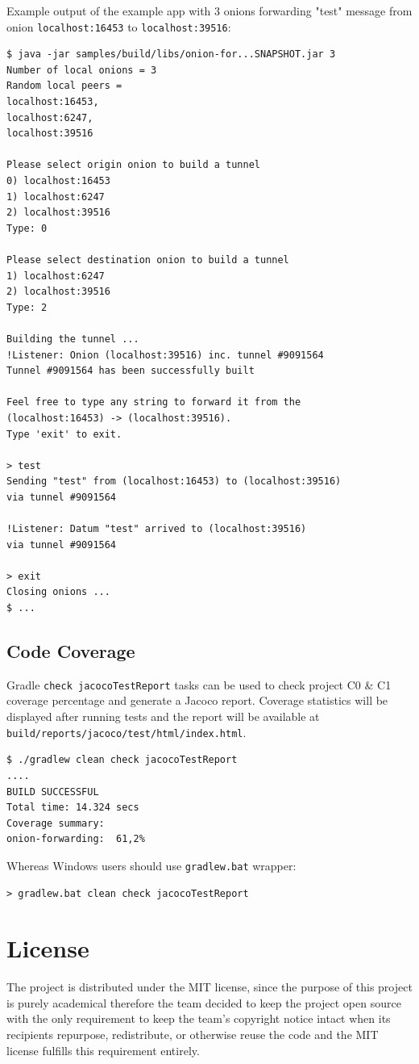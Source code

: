 \documentclass{article}
\begin{document}
Example output of the example app with 3 onions forwarding "test" message from onion \verb|localhost:16453| to \verb|localhost:39516|:
\begin{lstlisting}
$ java -jar samples/build/libs/onion-for...SNAPSHOT.jar 3
Number of local onions = 3
Random local peers = 
localhost:16453, 
localhost:6247, 
localhost:39516

Please select origin onion to build a tunnel
0) localhost:16453
1) localhost:6247
2) localhost:39516
Type: 0

Please select destination onion to build a tunnel
1) localhost:6247
2) localhost:39516
Type: 2

Building the tunnel ...
!Listener: Onion (localhost:39516) inc. tunnel #9091564
Tunnel #9091564 has been successfully built

Feel free to type any string to forward it from the 
(localhost:16453) -> (localhost:39516). 
Type 'exit' to exit.

> test
Sending "test" from (localhost:16453) to (localhost:39516) 
via tunnel #9091564

!Listener: Datum "test" arrived to (localhost:39516) 
via tunnel #9091564

> exit
Closing onions ...
$ ...
\end{lstlisting}

\subsection{Code Coverage}
Gradle \verb|check jacocoTestReport| tasks can be used to check project C0 \& C1 coverage percentage and generate a Jacoco report. Coverage statistics will be displayed after running tests and the report will be available at \verb|build/reports/jacoco/test/html/index.html|.
\begin{lstlisting}
$ ./gradlew clean check jacocoTestReport
....
BUILD SUCCESSFUL
Total time: 14.324 secs
Coverage summary:
onion-forwarding:  61,2%
\end{lstlisting}

Whereas Windows users should use \verb|gradlew.bat| wrapper:
\begin{lstlisting}
> gradlew.bat clean check jacocoTestReport
\end{lstlisting}

\section{License}
The project is distributed under the MIT license, since the purpose of this project is purely academical therefore the team decided to keep the project open source with the only requirement to keep the team's copyright notice intact when its recipients repurpose, redistribute, or otherwise reuse the code and the MIT license fulfills this requirement entirely.

 
\nocite{torproject}
\nocite{netty}
\nocite{onionrouting}

\printbibliography
\end{document}
